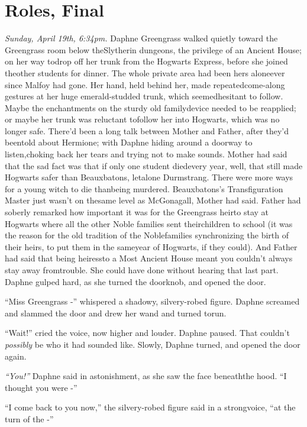 \chapter{Roles, Final}

\emph{Sunday, April 19th, 6:34pm.}
Daphne Greengrass walked quietly toward the Greengrass room below theSlytherin dungeons, the privilege of an Ancient House; on her way todrop off her trunk from the Hogwarts Express, before she joined theother students for dinner. The whole private area had been hers aloneever since Malfoy had gone. Her hand, held behind her, made repeatedcome-along gestures at her huge emerald-studded trunk, which seemedhesitant to follow. Maybe the enchantments on the sturdy old familydevice needed to be reapplied; or maybe her trunk was reluctant tofollow her into Hogwarts, which was no longer safe.
There'd been a long talk between Mother and Father, after they'd beentold about Hermione; with Daphne hiding around a doorway to listen,choking back her tears and trying not to make sounds.
Mother had said that the sad fact was that if only one student diedevery year, well, that still made Hogwarts safer than Beauxbatons, letalone Durmstrang. There were more ways for a young witch to die thanbeing murdered. Beauxbatons's Transfiguration Master just wasn't on thesame level as McGonagall, Mother had said.
Father had soberly remarked how important it was for the Greengrass heirto stay at Hogwarts where all the other Noble families sent theirchildren to school (it was the reason for the old tradition of the Noblefamilies synchronizing the birth of their heirs, to put them in the sameyear of Hogwarts, if they could). And Father had said that being heiressto a Most Ancient House meant you couldn't always stay away fromtrouble.
She could have done without hearing that last part.
Daphne gulped hard, as she turned the doorknob, and opened the door.

``Miss Greengrass -'' whispered a shadowy, silvery-robed figure.
Daphne screamed and slammed the door and drew her wand and turned torun.

``Wait!'' cried the voice, now higher and louder.
Daphne paused. That couldn't \emph{possibly} be who it had sounded like.
Slowly, Daphne turned, and opened the door again.

\emph{``You!''} Daphne said in astonishment, as she saw the face beneaththe hood. ``I thought you were -''

``I come back to you now,'' the silvery-robed figure said in a strongvoice, ``at the turn of the -''

